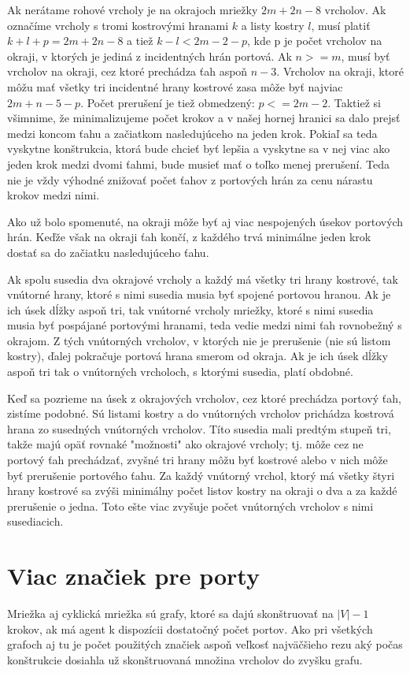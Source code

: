 Ak nerátame rohové vrcholy je na okrajoch mriežky $2m + 2n - 8$ vrcholov. 
Ak označíme vrcholy s tromi
kostrovými hranami $k$ a listy kostry $l$, musí platiť $k + l + p = 2m + 2n
- 8$ a tiež $k - l < 2m - 2 - p$, kde p je počet vrcholov na okraji, v
ktorých je jediná z incidentných hrán portová.
Ak $n >= m$, musí byť vrcholov na okraji, cez ktoré prechádza ťah aspoň $n-3$.
Vrcholov na okraji, ktoré môžu mať všetky tri incidentné hrany kostrové zasa
môže byť najviac $2m + n - 5 - p$. Počet prerušení je tiež obmedzený: $p <=
2m - 2$. Taktiež si všimnime, že minimalizujeme počet krokov a v našej
hornej hranici sa dalo prejsť medzi koncom ťahu a začiatkom nasledujúceho na
jeden krok. Pokiaľ sa teda vyskytne konštrukcia, ktorá bude chcieť byť
lepšia a vyskytne sa v nej viac ako jeden krok medzi dvomi ťahmi, bude
musieť mať o toľko menej prerušení. Teda nie je vždy výhodné znižovať počet
ťahov z portových hrán za cenu nárastu krokov medzi nimi.

Ako už bolo spomenuté, na okraji môže byť aj viac nespojených úsekov
portových hrán. Keďže však na okraji ťah končí, z každého trvá minimálne
jeden krok dostať sa do začiatku nasledujúceho ťahu.

Ak spolu susedia dva okrajové vrcholy a každý má všetky tri hrany kostrové,
tak vnútorné hrany, ktoré s nimi susedia musia byť spojené portovou hranou.
Ak je ich úsek dĺžky aspoň tri, tak vnútorné vrcholy mriežky, ktoré s nimi
susedia musia byť pospájané portovými hranami, teda vedie medzi nimi ťah
rovnobežný s okrajom. Z tých vnútorných vrcholov, v ktorých nie je
prerušenie (nie sú listom kostry), ďalej pokračuje portová hrana smerom od
okraja. Ak je ich úsek dĺžky aspoň tri tak o vnútorných vrcholoch, s ktorými
susedia, platí obdobné.

Keď sa pozrieme na úsek z okrajových vrcholov, cez ktoré prechádza portový
ťah, zistíme podobné. Sú listami kostry a do vnútorných vrcholov prichádza
kostrová hrana zo susedných vnútorných vrcholov. Títo susedia mali predtým
stupeň tri, takže majú opäť rovnaké "možnosti" ako okrajové vrcholy; tj.
môže cez ne portový ťah prechádzať, zvyšné tri hrany môžu byť kostrové
alebo v nich môže byť prerušenie portového ťahu. Za každý vnútorný vrchol,
ktorý má všetky štyri hrany kostrové sa zvýši minimálny počet listov kostry
na okraji o dva a za každé prerušenie o jedna. Toto ešte viac zvyšuje počet
vnútorných vrcholov s nimi susediacich.





\section{Viac značiek pre porty}
Mriežka aj cyklická mriežka sú grafy, ktoré sa dajú skonštruovať na $|V| - 1$
krokov, ak má agent k dispozícii dostatočný počet portov. Ako pri všetkých
grafoch aj tu je počet použitých značiek aspoň veľkosť najväčšieho rezu aký
počas konštrukcie dosiahla už skonštruovaná množina vrcholov do zvyšku
grafu.

